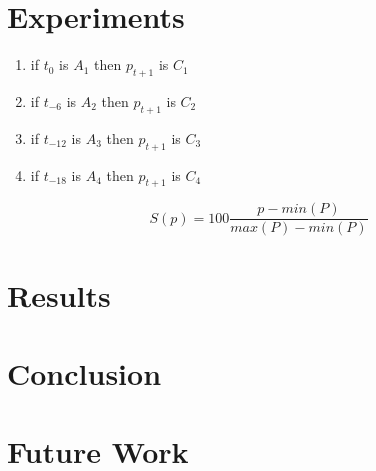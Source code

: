 \documentclass[conference]{IEEEtran}
\begin{document}
\section{Experiments}
\label{experiments}

\begin{enumerate}
  \item if $t_{0}$ is $A_{1}$ then $p_{t+1}$ is $C_{1}$
  \item if $t_{-6}$ is $A_{2}$ then $p_{t+1}$ is $C_{2}$
  \item if $t_{-12}$ is $A_{3}$ then $p_{t+1}$ is $C_{3}$
  \item if $t_{-18}$ is $A_{4}$ then $p_{t+1}$ is $C_{4}$
\end{enumerate}

\begin{equation}
  \label{scaling}
  S(p) = 100 \frac{p - min(P)}{max(P) - min(P)}
\end{equation}

\section{Results}
\label{results}

\section{Conclusion}
\label{conclusion}

\section{Future Work}
\label{future-work}



\end{document}
